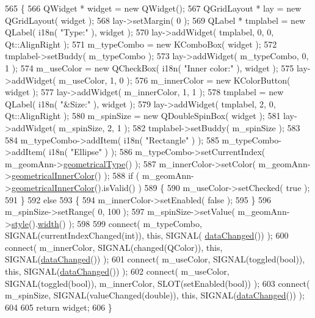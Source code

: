 \begin{DoxyCode}
565 \{
566     QWidget * widget = \textcolor{keyword}{new} QWidget();
567     QGridLayout * lay = \textcolor{keyword}{new} QGridLayout( widget );
568     lay->setMargin( 0 );
569     QLabel * tmplabel = \textcolor{keyword}{new} QLabel( i18n( \textcolor{stringliteral}{"Type:"} ), widget );
570     lay->addWidget( tmplabel, 0, 0, Qt::AlignRight );
571     m\_typeCombo = \textcolor{keyword}{new} KComboBox( widget );
572     tmplabel->setBuddy( m\_typeCombo );
573     lay->addWidget( m\_typeCombo, 0, 1 );
574     m\_useColor = \textcolor{keyword}{new} QCheckBox( i18n( \textcolor{stringliteral}{"Inner color:"} ), widget );
575     lay->addWidget( m\_useColor, 1, 0 );
576     m\_innerColor = \textcolor{keyword}{new} KColorButton( widget );
577     lay->addWidget( m\_innerColor, 1, 1 );
578     tmplabel = \textcolor{keyword}{new} QLabel( i18n( \textcolor{stringliteral}{"&Size:"} ), widget );
579     lay->addWidget( tmplabel, 2, 0, Qt::AlignRight );
580     m\_spinSize = \textcolor{keyword}{new} QDoubleSpinBox( widget );
581     lay->addWidget( m\_spinSize, 2, 1 );
582     tmplabel->setBuddy( m\_spinSize );
583 
584     m\_typeCombo->addItem( i18n( \textcolor{stringliteral}{"Rectangle"} ) );
585     m\_typeCombo->addItem( i18n( \textcolor{stringliteral}{"Ellipse"} ) );
586     m\_typeCombo->setCurrentIndex( m\_geomAnn->\hyperlink{classOkular_1_1GeomAnnotation_adeae1cc4b72aed7e9705b51f91f8555f}{geometricalType}() );
587     m\_innerColor->setColor( m\_geomAnn->\hyperlink{classOkular_1_1GeomAnnotation_a5c84e1cbdf0d2bb6b75b6d6b049af63b}{geometricalInnerColor}() );
588     \textcolor{keywordflow}{if} ( m\_geomAnn->\hyperlink{classOkular_1_1GeomAnnotation_a5c84e1cbdf0d2bb6b75b6d6b049af63b}{geometricalInnerColor}().isValid() )
589     \{
590         m\_useColor->setChecked( \textcolor{keyword}{true} );
591     \}
592     \textcolor{keywordflow}{else}
593     \{
594         m\_innerColor->setEnabled( \textcolor{keyword}{false} );
595     \}
596     m\_spinSize->setRange( 0, 100 );
597     m\_spinSize->setValue( m\_geomAnn->\hyperlink{classOkular_1_1Annotation_ae1f845ddbd6d524b2b388c6c9ef26423}{style}().\hyperlink{classOkular_1_1Annotation_1_1Style_a5a8e23f3a4f95e25f45770937dc82948}{width}() );
598 
599     connect( m\_typeCombo, SIGNAL(currentIndexChanged(\textcolor{keywordtype}{int})), \textcolor{keyword}{this}, SIGNAL(
      \hyperlink{classAnnotationWidget_af9dcb02a8b69a602225c9844b5deb6d4}{dataChanged}()) );
600     connect( m\_innerColor, SIGNAL(changed(QColor)), \textcolor{keyword}{this}, SIGNAL(\hyperlink{classAnnotationWidget_af9dcb02a8b69a602225c9844b5deb6d4}{dataChanged}()) );
601     connect( m\_useColor, SIGNAL(toggled(\textcolor{keywordtype}{bool})), \textcolor{keyword}{this}, SIGNAL(\hyperlink{classAnnotationWidget_af9dcb02a8b69a602225c9844b5deb6d4}{dataChanged}()) );
602     connect( m\_useColor, SIGNAL(toggled(\textcolor{keywordtype}{bool})), m\_innerColor, SLOT(setEnabled(\textcolor{keywordtype}{bool})) );
603     connect( m\_spinSize, SIGNAL(valueChanged(\textcolor{keywordtype}{double})), \textcolor{keyword}{this}, SIGNAL(\hyperlink{classAnnotationWidget_af9dcb02a8b69a602225c9844b5deb6d4}{dataChanged}()) );
604 
605     \textcolor{keywordflow}{return} widget;
606 \}
\end{DoxyCode}


